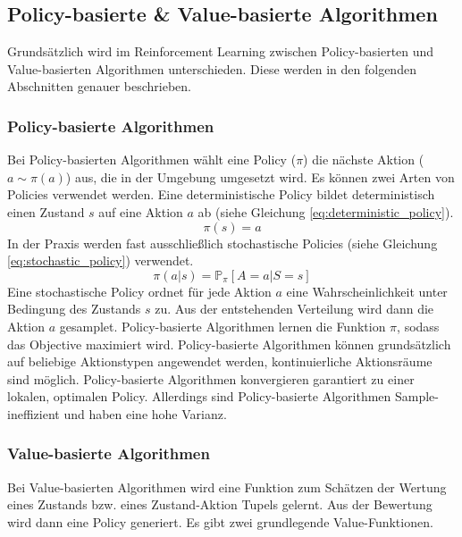 \subsection{Policy-basierte \& Value-basierte Algorithmen}
Grundsätzlich wird im Reinforcement Learning zwischen Policy-basierten und Value-basierten Algorithmen unterschieden. Diese werden in den folgenden Abschnitten genauer beschrieben.

\subsubsection{Policy-basierte Algorithmen}
Bei Policy-basierten Algorithmen wählt eine Policy ($\pi$) die nächste Aktion ($a \sim \pi(a)$) aus, die in der Umgebung umgesetzt wird. Es können zwei Arten von Policies verwendet werden. Eine deterministische Policy bildet deterministisch einen Zustand $s$ auf eine Aktion $a$ ab (siehe Gleichung \ref{eq:deterministic_policy}). 
\begin{equation}
    \pi(s) = a
    \label{eq:deterministic_policy}
\end{equation}
In der Praxis werden fast ausschließlich stochastische Policies (siehe Gleichung \ref{eq:stochastic_policy}) verwendet.
\begin{equation}
    \pi(a\vert s) = \mathbb{P}_{\pi}\left[ A=a \vert S=s \right]
    \label{eq:stochastic_policy}
\end{equation}
Eine stochastische Policy ordnet für jede Aktion $a$ eine Wahrscheinlichkeit unter Bedingung des Zustands $s$ zu. Aus der entstehenden Verteilung wird dann die Aktion $a$ gesamplet. Policy-basierte Algorithmen lernen die Funktion $\pi$, sodass das Objective maximiert wird.
Policy-basierte Algorithmen können grundsätzlich auf beliebige Aktionstypen angewendet werden, kontinuierliche Aktionsräume sind möglich. Policy-basierte Algorithmen konvergieren garantiert zu einer lokalen, optimalen Policy. Allerdings sind Policy-basierte Algorithmen Sample-ineffizient und haben eine hohe Varianz.

\subsubsection{Value-basierte Algorithmen}
Bei Value-basierten Algorithmen wird eine Funktion zum Schätzen der Wertung eines Zustands bzw. eines Zustand-Aktion Tupels gelernt. Aus der Bewertung wird dann eine Policy generiert. Es gibt zwei grundlegende Value-Funktionen.

